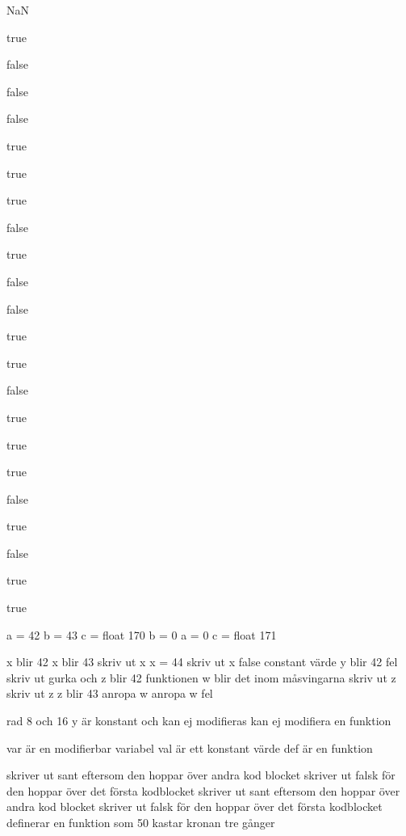 \Subtask NaN

\Subtask 

\Task %
\Subtask true

\Subtask false

\Subtask false

\Subtask false

\Subtask true

\Subtask true

\Subtask true

\Subtask false

\Subtask true

\Subtask false

\Subtask false

\Subtask true

\Subtask true

\Subtask false

\Subtask true

\Subtask true

\Subtask true

\Subtask false

\Subtask true

\Subtask false

\Subtask true

\Subtask true

\Task %
a = 42
b = 43
c = float 170
b = 0
a = 0
c = float 171

\Task %

\Subtask 

x blir 42
x blir 43
skriv ut x
x = 44
skriv ut x
false
constant värde y blir 42
fel
skriv ut gurka och z blir 42
funktionen w blir det inom måsvingarna
skriv ut z
skriv ut z
z blir 43
anropa w
anropa w
fel

\Subtask 

rad 8 och 16 
y är konstant och kan ej modifieras
kan ej modifiera en funktion

\Subtask 

var är en modifierbar variabel
val är ett konstant värde
def är en funktion

\Task %

skriver ut sant eftersom den hoppar över andra kod blocket
skriver ut falsk för den hoppar över det första kodblocket
skriver ut sant eftersom den hoppar över andra kod blocket
skriver ut falsk för den hoppar över det första kodblocket
definerar en funktion som 50%
kastar kronan tre gånger

\Task %

